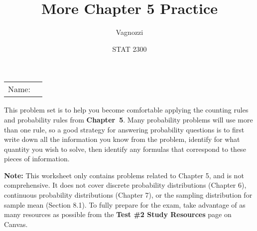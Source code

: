 \documentclass[noanswers]{exam}
\title{More Chapter 5 Practice}
\author{Vagnozzi}
\date{STAT 2300}
\begin{document}
\noindent\begin{tabular}{@{}p{.3in}p{3in}@{}}
Name: & \hrulefill
\end{tabular}

\vspace{3mm}

\noindent This problem set is to help you become comfortable applying the counting rules and probability rules from \textbf{Chapter~5}. Many probability problems will use more than one rule, so a good strategy for answering probability questions is to first write down all the information you know from the problem, identify for what quantity you wish to solve, then identify any formulas that correspond to these pieces of information.

\vspace{3mm}

\noindent \textbf{Note:} This worksheet only contains problems related to Chapter 5, and is not comprehensive. It does not cover discrete probability distributions (Chapter 6), continuous probability distributions (Chapter 7), or the sampling distribution for sample mean (Section 8.1). To fully prepare for the exam, take advantage of as many resources as possible from the \textbf{Test \#2 Study Resources} page on Canvas.

\vspace{3mm}
\end{document}
